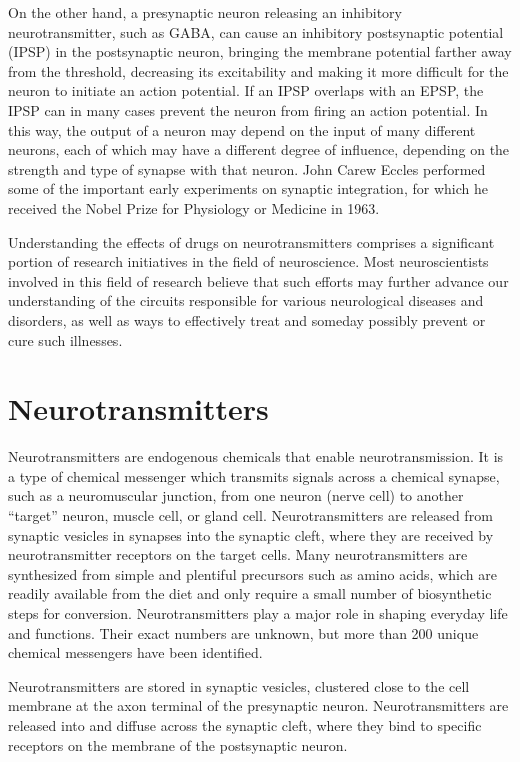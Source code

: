 On the other hand, a presynaptic neuron releasing an inhibitory neurotransmitter, such as GABA, can cause an inhibitory postsynaptic potential (IPSP) in the postsynaptic neuron, bringing the membrane potential farther away from the threshold, decreasing its excitability and making it more difficult for the neuron to initiate an action potential. If an IPSP overlaps with an EPSP, the IPSP can in many cases prevent the neuron from firing an action potential. In this way, the output of a neuron may depend on the input of many different neurons, each of which may have a different degree of influence, depending on the strength and type of synapse with that neuron. John Carew Eccles performed some of the important early experiments on synaptic integration, for which he received the Nobel Prize for Physiology or Medicine in 1963.

Understanding the effects of drugs on neurotransmitters comprises a significant portion of research initiatives in the field of neuroscience. Most neuroscientists involved in this field of research believe that such efforts may further advance our understanding of the circuits responsible for various neurological diseases and disorders, as well as ways to effectively treat and someday possibly prevent or cure such illnesses.

\hypertarget{neurotransmitters}{%
\section{Neurotransmitters}\label{neurotransmitters}}

Neurotransmitters are endogenous chemicals that enable neurotransmission. It is a type of chemical messenger which transmits signals across a chemical synapse, such as a neuromuscular junction, from one neuron (nerve cell) to another ``target'' neuron, muscle cell, or gland cell. Neurotransmitters are released from synaptic vesicles in synapses into the synaptic cleft, where they are received by neurotransmitter receptors on the target cells. Many neurotransmitters are synthesized from simple and plentiful precursors such as amino acids, which are readily available from the diet and only require a small number of biosynthetic steps for conversion. Neurotransmitters play a major role in shaping everyday life and functions. Their exact numbers are unknown, but more than 200 unique chemical messengers have been identified.

Neurotransmitters are stored in synaptic vesicles, clustered close to the cell membrane at the axon terminal of the presynaptic neuron. Neurotransmitters are released into and diffuse across the synaptic cleft, where they bind to specific receptors on the membrane of the postsynaptic neuron.

